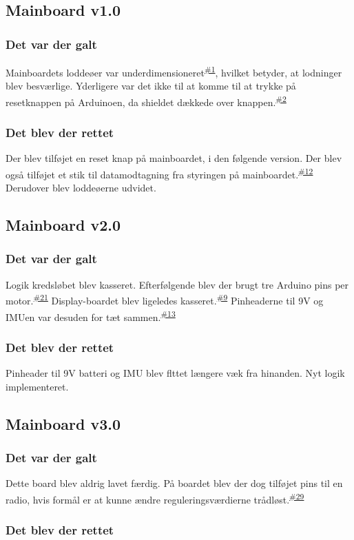 \documentclass[a4paper,11pt,oneside,article,danish,table]{memoir}
\newcommand{\boarddate}[1]{\marginpar{\tiny\textcolor{blue!80!black}{#1}}}
\newcommand{\issue}[1]{\textsuperscript{\textcolor{blue!80!black}{\href{https://github.com/neic/Swagway/issues/#1}{\##1}}}}
\begin{document}
\subsection{Mainboard v1.0}
\boarddate{24 jan 2012}
\subsubsection{Det var der galt}
Mainboardets loddeøer var underdimensioneret\issue{1}, hvilket betyder, at lodninger blev besværlige. Yderligere var det ikke til at komme til at trykke på resetknappen på Arduinoen, da shieldet dækkede over knappen.\issue{2} 
\subsubsection{Det blev der rettet}
Der blev tilføjet en reset knap på mainboardet, i den følgende version. Der blev også tilføjet et stik til datamodtagning fra styringen på mainboardet.\issue{12}
Derudover blev loddeøerne udvidet.
\subsection{Mainboard v2.0}
\boarddate{1 marts 2012}
\subsubsection{Det var der galt}
Logik kredsløbet blev kasseret. Efterfølgende blev der brugt tre Arduino pins per motor.\issue{21} Display-boardet blev ligeledes kasseret.\issue{9} Pinheaderne til 9V og IMUen var desuden for tæt sammen.\issue{13}
\subsubsection{Det blev der rettet}
Pinheader til 9V batteri og IMU blev flttet længere væk fra hinanden. Nyt logik implementeret.
\subsection{Mainboard v3.0}
\boarddate{26 marts 2012} 
\subsubsection{Det var der galt}
Dette board blev aldrig lavet færdig.
På boardet blev der dog tilføjet pins til en radio, hvis formål er at kunne ændre reguleringsværdierne trådløst.\issue{29}
\subsubsection{Det blev der rettet}
\end{document}
